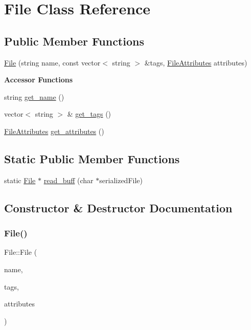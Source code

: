 \hypertarget{classFile}{}\section{File Class Reference}
\label{classFile}
\subsection*{Public Member Functions}
\begin{DoxyCompactItemize}
\item 
\mbox{\hyperlink{classFile_af29e498f601951f4ccf06f2fc3fb1f73}{File}} (string name, const vector$<$ string $>$ \&tags, \mbox{\hyperlink{structfile__attributes}{File\+Attributes}} attributes)
\end{DoxyCompactItemize}
\begin{Indent}\textbf{ Accessor Functions}\par
\begin{DoxyCompactItemize}
\item 
string \mbox{\hyperlink{classFile_a4b8e86f4fae0219744cf82f6bab35b53}{get\+\_\+name}} ()
\item 
vector$<$ string $>$ \& \mbox{\hyperlink{classFile_a479270bfe1fa436d317151ac108eb28a}{get\+\_\+tags}} ()
\item 
\mbox{\hyperlink{structfile__attributes}{File\+Attributes}} \mbox{\hyperlink{classFile_a9f59d3d546e8e574889558d63c71bf02}{get\+\_\+attributes}} ()
\end{DoxyCompactItemize}
\end{Indent}
\subsection*{Static Public Member Functions}
\begin{DoxyCompactItemize}
\item 
static \mbox{\hyperlink{classFile}{File}} $\ast$ \mbox{\hyperlink{classFile_abd409818fbd7f3a2319f2b27a62c8ccd}{read\+\_\+buff}} (char $\ast$serialized\+File)
\end{DoxyCompactItemize}


\subsection{Constructor \& Destructor Documentation}
\mbox{\label{classFile_af29e498f601951f4ccf06f2fc3fb1f73}} 
\subsubsection{\texorpdfstring{File()}{File()}}
{\footnotesize\ttfamily File\+::\+File (\begin{DoxyParamCaption}\item[{string}]{name,  }\item[{const vector$<$ string $>$ \&}]{tags,  }\item[{\mbox{\hyperlink{structfile__attributes}{File\+Attributes}}}]{attributes }\end{DoxyParamCaption})}


